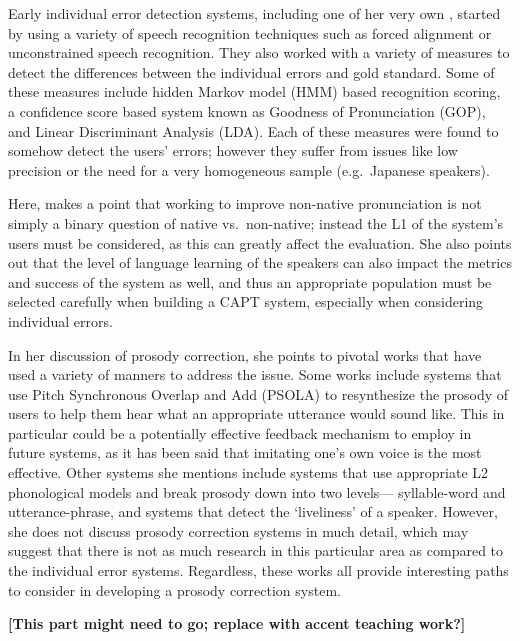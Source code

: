 \documentclass
[
    a4paper,
    twoside,
    12pt
]
{report}
\begin{document}
Early individual error detection systems, including one of her very own
\textcite{eskenazi1998}, started by using a variety of speech
recognition techniques such as forced alignment or unconstrained speech
recognition. They also worked with a variety of measures to detect the
differences between the individual errors and gold standard. Some of
these measures include hidden Markov model (HMM) based recognition
scoring, a confidence score based system known as Goodness of
Pronunciation (GOP), and Linear Discriminant Analysis (LDA). Each of
these measures were found to somehow detect the users' errors; however
they suffer from issues like low precision or the need for a very
homogeneous sample (e.g.~Japanese speakers).

Here, \textcite{eskenazi2009} makes a point that working to improve
non-native pronunciation is not simply a binary question of native
vs.~non-native; instead the L1 of the system's users must be considered,
as this can greatly affect the evaluation. She also points out that the
level of language learning of the speakers can also impact the metrics
and success of the system as well, and thus an appropriate population
must be selected carefully when building a CAPT system, especially when
considering individual errors.

In her discussion of prosody correction, she points to pivotal works
that have used a variety of manners to address the issue. Some works
include systems that use Pitch Synchronous Overlap and Add (PSOLA) to
resynthesize the prosody of users to help them hear what an appropriate
utterance would sound like. This in particular could be a potentially
effective feedback mechanism to employ in future systems, as it has been
said that imitating one's own voice is the most effective. Other systems
she mentions include systems that use appropriate L2 phonological models
and break prosody down into two levels--- syllable-word and
utterance-phrase, and systems that detect the `liveliness' of a speaker.
However, she does not discuss prosody correction systems in much detail,
which may suggest that there is not as much research in this particular
area as compared to the individual error systems. Regardless, these
works all provide interesting paths to consider in developing a prosody
correction system.

\textbf{{[}This part might need to go; replace with accent teaching
work?{]}}
\end{document}
